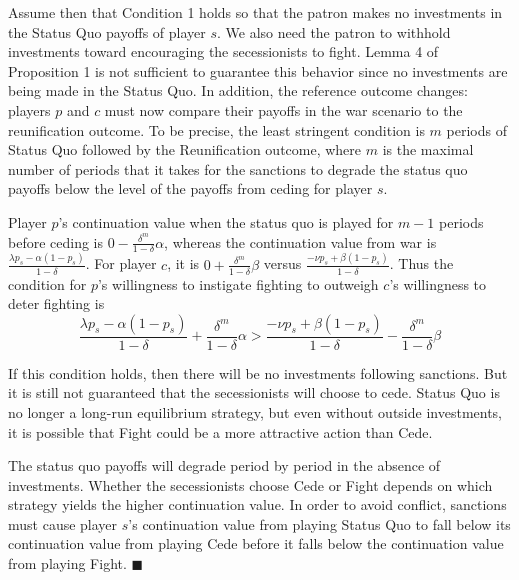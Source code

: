 \documentclass[11pt,letterpaper, notitlepage]{article}
\newcommand{\de}{\delta}
\begin{document}
Assume then that Condition 1 holds so that the patron makes no investments in the Status Quo payoffs of player $s$. We also need the patron to withhold investments toward encouraging the secessionists to fight. Lemma 4 of Proposition 1 is not sufficient to guarantee this behavior since no investments are being made in the Status Quo. In addition, the reference outcome changes: players $p$ and $c$ must now compare their payoffs in the war scenario to the reunification outcome. To be precise, the least stringent condition is $m$ periods of Status Quo followed by the Reunification outcome, where $m$ is the maximal number of periods that it takes for the sanctions to degrade the status quo payoffs below the level of the payoffs from ceding for player $s$. 

Player $p$'s continuation value when the status quo is played for $m-1$ periods before ceding is $0 - \frac{\de^m}{1-\de} \alpha$, whereas the continuation value from war is $\frac{\lambda p_s - \alpha (1-p_s)}{1-\de}$. For player $c$, it is $0 + \frac{\de^m}{1-\de} \beta$ versus $\frac{-\nu p_s + \beta (1 - p_s)}{1-\de}$. Thus the condition for $p$'s willingness to instigate fighting to outweigh $c$'s willingness to deter fighting is
\[
  \textstyle \frac{\lambda p_s - \alpha (1-p_s)}{1-\de} + \frac{\de^m}{1-\de} \alpha > \frac{-\nu p_s + \beta (1-p_s)}{1-\de} -  \frac{\de^m}{1-\de} \beta
\]

If this condition holds, then there will be no investments following sanctions. But it is still not guaranteed that the secessionists will choose to cede. Status Quo is no longer a long-run equilibrium strategy, but even without outside investments, it is possible that Fight could be a more attractive action than Cede.

The status quo payoffs will degrade period by period in the absence of investments. Whether the secessionists choose Cede or Fight depends on which strategy yields the higher continuation value. In order to avoid conflict, sanctions must cause player $s$'s continuation value from playing Status Quo to fall below its continuation value from playing Cede before it falls below the continuation value from playing Fight. \hfill $\blacksquare$


\end{document}
